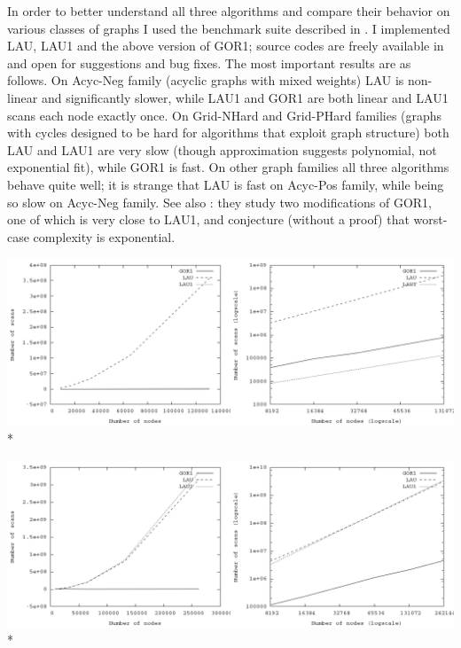 \documentclass{article}
\newenvironment{Xfig}
    {\par\medskip\noindent\minipage{\linewidth}\begin{center}}
    {\end{center}\endminipage\par\medskip}
\theoremstyle{definition}
\begin{document}
\begin{multicols}{2}
In order to better understand all three algorithms and compare their behavior on various classes of graphs
I used the benchmark suite described in \cite{CGR96}.
I implemented LAU, LAU1 and the above version of GOR1;
source codes are freely available in \cite{Tro17} and open for suggestions and bug fixes.
The most important results are as follows.
On Acyc-Neg family (acyclic graphs with mixed weights)
LAU is non-linear and significantly slower,
while LAU1 and GOR1 are both linear and LAU1 scans each node exactly once.
On Grid-NHard and Grid-PHard families (graphs with cycles designed to be hard for algorithms that exploit graph structure)
both LAU and LAU1 are very slow (though approximation suggests polynomial, not exponential fit),
while GOR1 is fast.
On other graph families all three algorithms behave quite well;
it is strange that LAU is fast on Acyc-Pos family, while being so slow on Acyc-Neg family.
See also \cite{NPX99}: they study two modifications of GOR1, one of which is very close to LAU1,
and conjecture (without a proof) that worst-case complexity is exponential.

\end{multicols}

\begin{Xfig}
\includegraphics[width=\linewidth]{img/plot_acyc_neg_both.png}\\*
\end{Xfig}

\begin{Xfig}
\includegraphics[width=\linewidth]{img/plot_grid_nhard_both.png}\\*
\end{Xfig}
\end{document}
